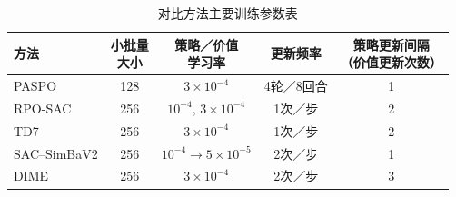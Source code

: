 \begin{table}[H]
 \centering
 \caption{对比方法主要训练参数表}
 \label{tab:ch2-baseline-settings}
 \begingroup\small
 \setlength{\tabcolsep}{4pt}
 \begin{tabular}{lcccc}
  \toprule
  方法 & \shortstack{小批量\\大小} & \shortstack{策略／价值\\学习率} & 更新频率 & \shortstack{策略更新间隔\\（价值更新次数）} \\
  \midrule
  PASPO & 128 & \(3\times10^{-4}\) & 4轮／8回合 & 1 \\
  RPO-SAC & 256 & \(10^{-4},\,3\times10^{-4}\) & 1次／步 & 2 \\
  TD7 & 256 & \(3\times10^{-4}\) & 1次／步 & 2 \\
  SAC--SimBaV2 & 256 & \(10^{-4}\to5\times10^{-5}\) & 2次／步 & 1 \\
  DIME & 256 & \(3\times10^{-4}\) & 2次／步 & 3 \\
  \bottomrule
 \end{tabular}
 \endgroup
\end{table}
